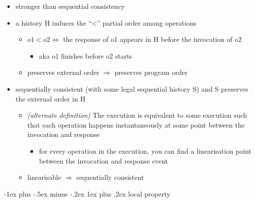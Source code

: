 \documentclass[10pt, landscape]{article}
\makeatletter
\renewcommand{\subsubsection}{\@startsection{subsubsection}{3}{0mm}%
  {-1ex plus -.5ex minus -.2ex}%
  {1ex plus .2ex}%
{\normalfont\small\bfseries}}%
\makeatother
\begin{document}
\begin{multicols*}{3}
  \begin{itemize}
    \item stronger than sequential consistency
    \item {} a history H induces the “<” partial order among operations
      \begin{itemize}
        \item $o1 < o2 \iff$ the response of o1 appears in H before the invocation of o2
          \begin{itemize}
            \item aka o1 finishes before o2 starts
          \end{itemize}
        \item preserves external order $\Rightarrow$ preserves program order
      \end{itemize}
    \item {} sequentially consistent (with some legal sequential history S) and S preserves the external order in H
      \begin{itemize}
        \item \textit{(alternate definition)} The execution is equivalent to some execution such that each operation happens instantaneously at some point between the invocation and response
          \begin{itemize}
            \item for every operation in the execution, you can find a linearisation point between the invocation and response event
          \end{itemize}
        \item linearisable $\Rightarrow$ sequentially consistent
      \end{itemize}
  \end{itemize}

  \subsubsection{local property}


\end{multicols*}
\end{document}
